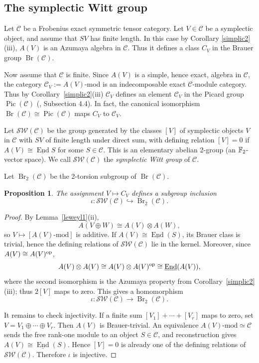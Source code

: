 \documentclass[12pt]{amsart}
\numberwithin{equation}{section}
\providecommand{\C}{}\renewcommand{\C}{\mathcal{C}}
\providecommand{\End}{}\renewcommand{\End}{\operatorname{End}}
\providecommand{\Pic}{}\renewcommand{\Pic}{\operatorname{Pic}}
\providecommand{\Br}{}\renewcommand{\Br}{\operatorname{Br}}
\theoremstyle{plain}
\newtheorem{proposition}[theorem]{Proposition}
\theoremstyle{definition}
\theoremstyle{remark}
\begin{document}
\subsection{The symplectic Witt group} 

Let $\C$ be a Frobenius exact symmetric tensor category. Let $V\in \C$ be a symplectic object, and assume that $SV$ has finite length. In this case by Corollary \ref{simplic2}(iii), $A(V)$ is an Azumaya algebra in $\C$. 
Thus it defines a class $C_V$ in the Brauer group $\Br(\C)$. 

Now assume that $\C$ is finite. Since $A(V)$ is a simple, hence exact, algebra in $\C$, the category $\C_V:=A(V)$-mod is an indecomposable exact $\C$-module category. Thus by Corollary~\ref{simplic2}(iii) $\C_V$ defines an element $\C_V$ in the Picard group $\Pic(\C)$ (\cite{ENO}, Subsection 4.4). In fact, the canonical isomorphism $\Br(\C)\cong \Pic(\C)$ maps $C_V$ to $\C_V$.  

Let ${\mathcal S\mathcal W}(\C)$ be the group generated by the classes $[V]$ of symplectic objects $V$ in $\C$ with $SV$ of finite length under direct sum, with defining relation $[V]=0$ if $A(V)\cong \underline{\End}S$ for some $S\in \C$. This is an elementary abelian 2-group (an $\Bbb F_2$-vector space). We call ${\mathcal S\mathcal W}(\C)$ the {\it symplectic Witt group} of $\C$. 

Let $\Br_2(\C)$ be the 2-torsion subgroup of $\Br(\C)$. 

\begin{proposition}\label{symwitt0} The assignment $V\mapsto C_V$ defines a subgroup inclusion 
$$
\iota: {\mathcal S\mathcal W}(\C)\hookrightarrow \Br_2(\C).
$$ 
\end{proposition} 

\begin{proof}
By Lemma~\ref{leweyl1}(ii),
\[
 A(V\oplus W)\cong A(V)\otimes A(W),
\]
so $V\mapsto[A(V)\text{-mod}]$ is additive. If $A(V)\cong\underline{\End}(S)$, its Brauer class is trivial, hence the defining relations of ${\mathcal S\mathcal W}(\C)$ lie in the kernel. Moreover, since $A(V)\cong A(V)^{\rm op}$, 
\[
 A(V)\otimes A(V)\cong A(V)\otimes A(V)^{\rm op}
 \cong\underline{\End}(A(V)),
\]
where the second isomorphism is the Azumaya property from Corollary~\ref{simplic2}(iii); thus $2[V]$ maps to zero. This gives a homomorphism 
$$
\iota:{\mathcal S\mathcal W}(\C)\to\Br_2(\C).
$$

It remains to check injectivity. If a finite sum $[V_1]+\cdots+[V_r]$ maps to zero, set $V=V_1\oplus\cdots\oplus V_r$. Then $A(V)$ is Brauer-trivial. An equivalence $A(V)\text{-mod}\simeq\C$ sends the free rank-one module to an object $S\in\C$, and reconstruction gives $A(V)\cong\underline{\End}(S)$. Hence $[V]=0$ is already one of the defining relations of ${\mathcal S\mathcal W}(\C)$. Therefore $\iota$ is injective.
\end{proof}
\end{document}
